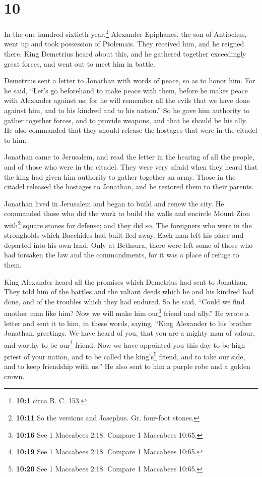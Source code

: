 \hypertarget{section-9}{%
\section{10}\label{section-9}}

 In the one hundred sixtieth year,\footnote{\textbf{10:1}
  circa B. C. 153.} Alexander Epiphanes, the son of Antiochus, went up
and took possession of Ptolemais. They received him, and he reigned
there.  King Demetrius heard about this, and he gathered
together exceedingly great forces, and went out to meet him in battle.

 Demetrius sent a letter to Jonathan with words of peace,
so as to honor him.  For he said, ``Let's go beforehand to
make peace with them, before he makes peace with Alexander against us;
 for he will remember all the evils that we have done
against him, and to his kindred and to his nation.''  So
he gave him authority to gather together forces, and to provide weapons,
and that he should be his ally. He also commanded that they should
release the hostages that were in the citadel to him.

 Jonathan came to Jerusalem, and read the letter in the
hearing of all the people, and of those who were in the citadel.
 They were very afraid when they heard that the king had
given him authority to gather together an army.  Those in
the citadel released the hostages to Jonathan, and he restored them to
their parents.

 Jonathan lived in Jerusalem and began to build and renew
the city.  He commanded those who did the work to build
the walls and encircle Mount Zion with\footnote{\textbf{10:11} So the
  versions and Josephus. Gr. four-foot stones.} square stones for
defense; and they did so.  The foreigners who were in the
strongholds which Bacchides had built fled away.  Each
man left his place and departed into his own land.  Only
at Bethsura, there were left some of those who had forsaken the law and
the commandments, for it was a place of refuge to them.

 King Alexander heard all the promises which Demetrius
had sent to Jonathan. They told him of the battles and the valiant deeds
which he and his kindred had done, and of the troubles which they had
endured.  So he said, ``Could we find another man like
him? Now we will make him our\footnote{\textbf{10:16} See 1 Maccabees
  2:18. Compare 1 Maccabees 10:65.} friend and ally.'' 
He wrote a letter and sent it to him, in these words, saying,
 ``King Alexander to his brother Jonathan, greetings.
 We have heard of you, that you are a mighty man of
valour, and worthy to be our\footnote{\textbf{10:19} See 1 Maccabees
  2:18. Compare 1 Maccabees 10:65.} friend.  Now we have
appointed you this day to be high priest of your nation, and to be
called the king's\footnote{\textbf{10:20} See 1 Maccabees 2:18. Compare
  1 Maccabees 10:65.} friend, and to take our side, and to keep
friendship with us.'' He also sent to him a purple robe and a golden
crown.

